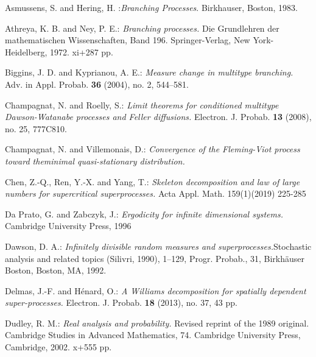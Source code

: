 \documentclass[12pt,a4paper]{amsart}
\numberwithin{equation}{section}
\theoremstyle{plain}
\theoremstyle{definition}
\theoremstyle{remark}
\begin{document}
\begin{thebibliography}{99}
	
Asmussens, S. and Hering, H. :\emph{Branching Processes}. Birkhauser, Boston, 1983.

Athreya, K. B. and Ney, P. E.:
\emph{Branching processes.}
Die Grundlehren der mathematischen Wissenschaften, Band 196. Springer-Verlag, New York-Heidelberg, 1972. xi+287 pp.

Biggins, J. D. and Kyprianou, A. E.:
\emph{Measure change in multitype branching.}
Adv. in Appl. Probab. \textbf{36} (2004), no. 2, 544--581.

Champagnat, N. and Roelly, S.:
\emph{Limit theorems for conditioned multitype Dawson-Watanabe processes and Feller diffusions.}
Electron. J. Probab. \textbf{13} (2008), no. 25, 777C810.

Champagnat, N. and Villemonais, D.:
\emph{Convergence of the Fleming-Viot process toward
theminimal quasi-stationary distribution.}

Chen, Z.-Q., Ren, Y.-X. and Yang, T.:
\emph{Skeleton decomposition and law of large numbers for supercritical superprocesses.}
Acta Appl. Math. 159(1)(2019) 225-285

	Da Prato, G. and Zabczyk, J.:
	\emph{Ergodicity for infinite dimensional systems.}
	Cambridge University Press, 1996

Dawson, D. A.:
\emph{Infinitely divisible random measures and superprocesses.}Stochastic analysis and related topics (Silivri, 1990), 1--129,
Progr. Probab., 31, Birkh{\"a}user Boston, Boston, MA, 1992.

Delmas, J.-F. and H\'enard, O.:
\emph{A Williams decomposition for spatially dependent super-processes. }
Electron. J. Probab. \textbf{18} (2013), no. 37, 43 pp.

Dudley, R. M.:
\emph{Real analysis and probability.}
Revised reprint of the 1989 original. Cambridge Studies in Advanced Mathematics, 74. Cambridge University Press, Cambridge, 2002. x+555 pp.


\end{thebibliography}
\end{document}
